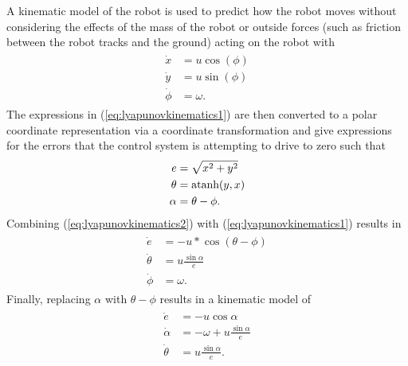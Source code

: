 A kinematic model of the robot is used to predict how the robot moves without considering the effects of the mass of the robot or outside forces (such as friction between the robot tracks and the ground) acting on the robot with
\begin{align}
\label{eq:lyapunovkinematics1}
\begin{split}
\dot{x} &= u\cos(\phi) \\
\dot{y} &= u\sin(\phi) \\
\dot{\phi} &= \omega.
\end{split}
\end{align}
The expressions in (\ref{eq:lyapunovkinematics1}) are then converted to a polar coordinate representation via a coordinate transformation and give expressions for the errors that the control system is attempting to drive to zero such that
\begin{align}
\label{eq:lyapunovkinematics2}
\begin{split}
e &= \sqrt{x^2+y^2} \\
\theta &= \mathop{\text{atanh}}(y,x) \\
\alpha &= \theta - \phi.
\end{split}
\end{align}
Combining (\ref{eq:lyapunovkinematics2}) with (\ref{eq:lyapunovkinematics1}) results in
\begin{align*}
\begin{split}
\dot{e} &= -u*\cos(\theta-\phi) \\
\dot{\theta} &= u\frac{\sin\alpha}{e} \\
\dot{\phi} &= \omega.
\end{split}
\end{align*}
Finally, replacing $\alpha$ with $\theta-\phi$ results in a kinematic model of
\begin{align}
\label{eq:lyapunovkinematics}
\begin{split}
\dot{e} &= -u\cos\alpha \\
\dot{\alpha} &= -\omega + u\frac{\sin\alpha}{e} \\
\dot{\theta} &= u\frac{\sin\alpha}{e}.
\end{split}
\end{align}

